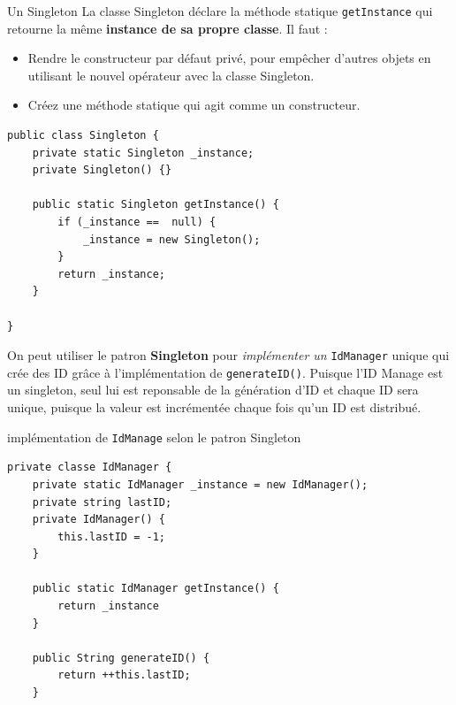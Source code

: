 \documentclass[16pt]{report}
\begin{document}
\begin{multicols*}{2}
        \begin{EExample}{Un Singleton}{}
            La classe Singleton déclare la méthode statique \texttt{\textcolor{myb}{getInstance}} 
            qui retourne la même \textbf{instance de sa propre classe}. 
            Il faut : 
            \begin{itemize}
                \item Rendre le constructeur par défaut privé, pour empêcher d'autres objets 
                    en utilisant le nouvel opérateur avec la classe Singleton.
                \item Créez une méthode statique qui agit comme un constructeur.
            \end{itemize}

\begin{lstlisting}[style=JavaDraculaWhite]
public class Singleton {
    private static Singleton _instance; 
    private Singleton() {}

    public static Singleton getInstance() {
        if (_instance ==  null) {
            _instance = new Singleton();
        }
        return _instance;
    }

}
\end{lstlisting}
        \end{EExample}                  

        \begin{note}{}{}
            On peut utiliser le patron \textbf{Singleton} pour \textit{implémenter un} \texttt{IdManager} unique qui 
            crée des ID grâce à l'implémentation de \texttt{generateID()}. Puisque l'ID Manage est 
            un singleton, seul lui est reponsable de la génération d'ID et chaque ID sera unique, 
            puisque la valeur est incrémentée chaque fois qu'un ID est distribué.
        \end{note}

        \begin{EExample}{implémentation de \texttt{IdManage} selon le patron Singleton  }{}


\begin{lstlisting}[style=JavaDraculaWhite]
private classe IdManager {
    private static IdManager _instance = new IdManager(); 
    private string lastID; 
    private IdManager() {
        this.lastID = -1;
    }

    public static IdManager getInstance() {
        return _instance
    }

    public String generateID() {
        return ++this.lastID;
    }


\end{lstlisting}
\end{EExample}
\end{multicols*}
\end{document}
